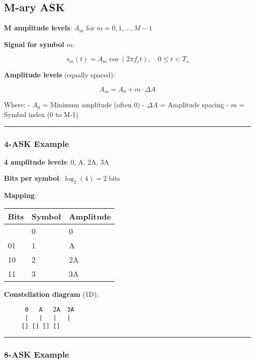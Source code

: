 \subsection{M-ary ASK}\label{m-ary-ask}

\textbf{M amplitude levels}: \(A_m\) for \(m = 0, 1, \ldots, M-1\)

\textbf{Signal for symbol} \(m\):

\[
s_m(t) = A_m \cos(2\pi f_c t), \quad 0 \leq t < T_s
\]

\textbf{Amplitude levels} (equally spaced):

\[
A_m = A_0 + m \cdot \Delta A
\]

Where: - \(A_0\) = Minimum amplitude (often 0) - \(\Delta A\) =
Amplitude spacing - \(m\) = Symbol index (0 to M-1)

\begin{center}\rule{0.5\linewidth}{0.5pt}\end{center}

\subsubsection{4-ASK Example}\label{ask-example}

\textbf{4 amplitude levels}: 0, A, 2A, 3A

\textbf{Bits per symbol}: \(\log_2(4) = 2\) bits

\textbf{Mapping}:

{\def\LTcaptype{} %
\begin{longtable}[]{@{}lll@{}}
\toprule\noalign{}
Bits & Symbol & Amplitude \\
\midrule\noalign{}
\endhead
\bottomrule\noalign{}
\endlastfoot
00 & 0 & 0 \\
01 & 1 & A \\
10 & 2 & 2A \\
11 & 3 & 3A \\
\end{longtable}
}

\textbf{Constellation diagram} (1D):

\begin{verbatim}
      0   A   2A  3A
      |   |   |   |
     [] [] [] []
\end{verbatim}

\begin{center}\rule{0.5\linewidth}{0.5pt}\end{center}

\subsubsection{8-ASK Example}\label{ask-example-1}

